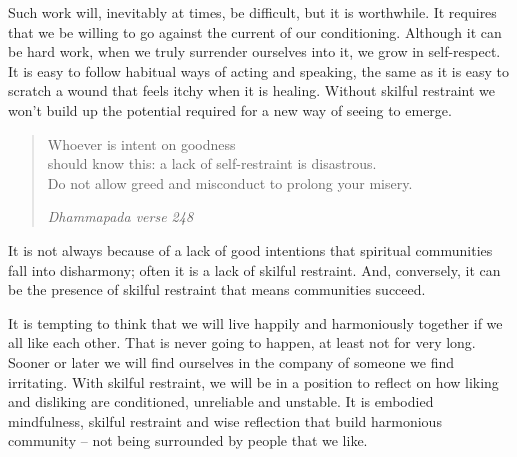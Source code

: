 Such work will, inevitably at times, be difficult, but it is worthwhile.
It requires that we be willing to go against the current of our
conditioning. Although it can be hard work, when we truly surrender
ourselves into it, we grow in self-respect. It is easy to follow
habitual ways of acting and speaking, the same as it is easy to scratch
a wound that feels itchy when it is healing. Without skilful restraint
we won't build up the potential required for a new way of seeing to
emerge.

\begin{quote}
  Whoever is intent on goodness\\
  should know this: a lack of self-restraint is disastrous.\\
  Do not allow greed and misconduct to prolong your misery.

  \emph{Dhammapada verse 248}
\end{quote}

It is not always because of a lack of good intentions that spiritual
communities fall into disharmony; often it is a lack of skilful
restraint. And, conversely, it can be the presence of skilful restraint
that means communities succeed.

It is tempting to think that we will live happily and harmoniously
together if we all like each other. That is never going to happen, at
least not for very long. Sooner or later we will find ourselves in the
company of someone we find irritating. With skilful restraint, we will
be in a position to reflect on how liking and disliking are conditioned,
unreliable and unstable. It is embodied mindfulness, skilful restraint
and wise reflection that build harmonious community -- not being
surrounded by people that we like.

